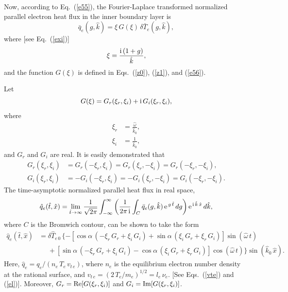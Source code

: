 \documentclass[12pt,prb,aps]{revtex4-1}
\begin{document}
Now, according to Eq.~(\ref{e55}), the Fourier-Laplace transformed normalized parallel electron heat flux in the inner boundary layer is
\begin{equation}
\bar{q}_e(g,\hat{k}) = \xi\,G(\xi)\,\delta\bar{T}_e(g,\hat{k}),
\end{equation}
where [see Eq.~(\ref{exi})]
\begin{equation}
\xi= \frac{{\rm i}\,(1+g)}{\hat{k}},
\end{equation}
and the function $G(\xi)$ is defined in Eqs.~(\ref{z0}), (\ref{z1}), and (\ref{e56}). 

Let
\begin{equation}
G(\xi) = G_r(\xi_r,\xi_i) + {\rm i}\,G_i(\xi_r,\xi_i),
\end{equation}
where
\begin{align}
\xi_r &= \frac{\hat{\omega}}{\hat{k}_0},\\[0.5ex]
\xi_i&= \frac{1}{\hat{k}_0},
\end{align}
and $G_r$ and $G_i$ are real. It is easily demonstrated that
\begin{align}
G_r(\xi_r,\xi_i)&= G_r(-\xi_r,\xi_i)= G_r(\xi_r,-\xi_i)=G_r(-\xi_r,-\xi_i),\\[0.5ex]
G_i(\xi_r,\xi_i)&=- G_i(-\xi_r,\xi_i)= -G_i(\xi_r,-\xi_i)=G_i(-\xi_r,-\xi_i).
\end{align}
The time-asymptotic normalized parallel heat flux in real space,
\begin{equation}
\hat{q}_e(\hat{t},\hat{x}) = \lim_{\hat{t}\rightarrow\infty}\frac{1}{\sqrt{2\pi}}\int_{-\infty}^{\infty}
\left(\frac{1}{2\pi\,{\rm i}}\int_C \bar{q}_e(g,\hat{k})\,{\rm e}^{\,g\,\hat{t}}\,dg\right){\rm e}^{\,{\rm i}\,\hat{k}\,\hat{x}}\,d\hat{k},
\end{equation}
where $C$ is the Bromwich contour, can be shown to take the form 
\begin{align}
\hat{q}_e(\hat{t},\hat{x}) &= \delta\hat{T}_{e\,0}\,\{-\left[\cos\alpha\,(-\xi_r\,G_r+\xi_i\,G_i)+\sin\alpha\,(\xi_i\,G_r+\xi_r\,G_i)\right]\sin(\hat{\omega}\,t)\nonumber\\[0.5ex]
&\phantom{=}+\left[\sin\alpha\,(-\xi_r\,G_r+\xi_i\,G_i)-\cos\alpha\,(\xi_i\,G_r+\xi_r\,G_i)\right]\cos(\hat{\omega}\,t)\}\sin(\hat{k}_0\,\hat{x}).
\end{align}
Here, $\hat{q}_e = q_e/(n_e\,T_e\,v_{t\,e})$, where $n_e$ is the equilibrium electron number density at the rational surface, and $v_{t\,e}= (2\,T_e/m_e)^{1/2}= l_e\,\nu_e$. [See Eqs.~(\ref{vte}) and (\ref{el})]. 
Moreover, $G_r= {\rm Re}[G(\xi_r,\xi_i)]$ and $G_i= {\rm Im}[G(\xi_r,\xi_i)]$.
\end{document}
